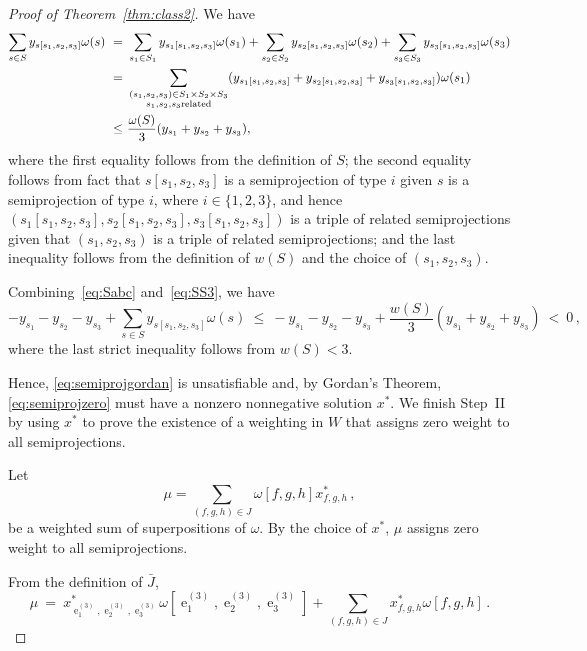 \documentclass[11pt, reqno]{article}
\DeclareMathOperator{\proj}{\ensuremath{e}}
\newcommand{\tuple}[1]{\ensuremath{(#1)}}
\theoremstyle{remark}
\begin{document}
\begin{proof}[Proof of Theorem~\ref{thm:class2}]
  We have
  \begin{equation}\label{eq:SS3}
  \begin{split}
    \sum_{s \in S}y_{s[s_1,s_2,s_3]}\omega(s)\ =\ &
    \sum_{s_1\in S_1}y_{s_1[s_1,s_2,s_3]}\omega(s_1) +
    \sum_{s_2\in S_2}y_{s_2[s_1,s_2,s_3]}\omega(s_2) + \sum_{s_3\in S_3}y_{s_3[s_1,s_2,s_3]}\omega(s_3) \\
    =\ & \sum_{\substack{\tuple{s_1,s_2,s_3}\in S_1\times S_2\times
    S_3\\s_1,s_2,s_3\mbox{\scriptsize related}}}(y_{s_1[s_1,s_2,s_3]}+y_{s_2[s_1,s_2,s_3]}+y_{s_3[s_1,s_2,s_3]})\omega(s_1) \\
    \leq\ & \frac{\omega(S)}{3}(y_{s_1}+y_{s_2}+y_{s_3}),\\
  \end{split}
  \end{equation}
  where the first equality follows from the definition of $S$; the second
  equality follows from fact that $s[s_1,s_2,s_3]$ is a semiprojection of type $i$
  given $s$ is a semiprojection of type $i$, where $i\in\{1,2,3\}$, and hence 
  $\tuple{s_1[s_1,s_2,s_3],s_2[s_1,s_2,s_3],s_3[s_1,s_2,s_3]}$ is a triple of
  related semiprojections given that $\tuple{s_1,s_2,s_3}$ is a triple of
  related semiprojections;  and the
  last inequality follows from the definition of $w(S)$ and the choice of
  $(s_1,s_2,s_3)$.

  Combining~\eqref{eq:Sabc} and~\eqref{eq:SS3}, we have
  \begin{equation}
    - y_{s_1} - y_{s_2} - y_{s_3} + \sum_{s \in S}y_{s[s_1,s_2,s_3]}\omega(s)
    \ \leq\ 
    - y_{s_1} - y_{s_2} - y_{s_3} + \frac{w(S)}{3}(y_{s_1}+y_{s_2}+y_{s_3})
    \ <\ 0\,,
  \end{equation}
 where the last strict inequality follows from $w(S)<3$.

  Hence, \eqref{eq:semiprojgordan} is unsatisfiable and, by Gordan's Theorem,
  \eqref{eq:semiprojzero} must have a nonzero nonnegative solution $x^*$. 
  We finish Step~II by using $x^*$ to prove the existence of a
  weighting in $W$ that assigns zero weight to all semiprojections.
  
  Let
  \begin{equation} \label{eq:Sresult} \mu=\sum_{(f,g,h) \in J}\omega[f,g,h]x^*_{f,g,h}\,, 
  \end{equation}
  be a weighted sum of superpositions of $\omega$. By the choice of $x^*$, $\mu$ 
  assigns zero weight to all semiprojections. 

  From the definition of $\bar{J}$,
  \begin{equation}\label{eq:Smu}
   \mu\ =\
   x^*_{\proj^{(3)}_1,\proj^{(3)}_2,\proj^{(3)}_3}\omega[\proj^{(3)}_1,\proj^{(3)}_2,\proj^{(3)}_3]+\sum_{(f,g,h) \in J}x^*_{f,g,h}\omega[f,g,h]\,.
  \end{equation}


\end{proof}
\end{document}
